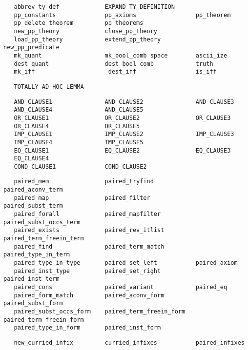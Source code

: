\begin{hol}\begin{verbatim}
   abbrev_ty_def             EXPAND_TY_DEFINITION
   pp_constants              pp_axioms                 pp_theorem
   pp_delete_theorem         pp_theorems
   new_pp_theory             close_pp_theory
   load_pp_theory            extend_pp_theory          new_pp_predicate
   mk_quant                  mk_bool_comb space        ascii_ize
   dest_quant                dest_bool_comb            truth
   mk_iff                     dest_iff                 is_iff
\end{verbatim}\end{hol}
\begin{hol}\begin{verbatim}
   TOTALLY_AD_HOC_LEMMA
\end{verbatim}\end{hol}
\begin{hol}\begin{verbatim}
   AND_CLAUSE1               AND_CLAUSE2               AND_CLAUSE3
   AND_CLAUSE4               AND_CLAUSE5
   OR_CLAUSE1                OR_CLAUSE2                OR_CLAUSE3
   OR_CLAUSE4                OR_CLAUSE5
   IMP_CLAUSE1               IMP_CLAUSE2               IMP_CLAUSE3
   IMP_CLAUSE4               IMP_CLAUSE5
   EQ_CLAUSE1                EQ_CLAUSE2                EQ_CLAUSE3
   EQ_CLAUSE4
   COND_CLAUSE1              COND_CLAUSE2
\end{verbatim}\end{hol}
\begin{hol}\begin{verbatim}
   paired_mem                paired_tryfind            paired_aconv_term
   paired_map                paired_filter             paired_subst_term
   paired_forall             paired_mapfilter          paired_subst_occs_term
   paired_exists             paired_rev_itlist         paired_term_freein_term
   paired_find               paired_term_match         paired_type_in_term
   paired_type_in_type       paired_set_left           paired_axiom
   paired_inst_type          paired_set_right          paired_inst_term
   paired_cons               paired_variant            paired_eq
   paired_form_match         paired_aconv_form         paired_subst_form
   paired_subst_occs_form    paired_term_freein_form   paired_term_freein_form
   paired_type_in_form       paired_inst_form
\end{verbatim}\end{hol}
\begin{hol}\begin{verbatim}
   new_curried_infix         curried_infixes           paired_infixes
\end{verbatim}\end{hol}
